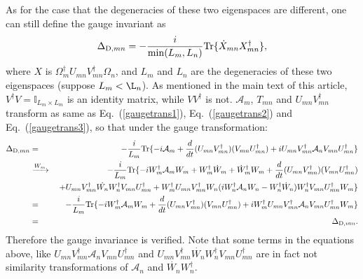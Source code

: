 \documentclass[aps,pra,twocolumn,groupedaddress,10pt]{revtex4}
\begin{document}
\begin{widetext}
As for the case that the degeneracies of these two eigenspaces
are different, one can still define the gauge invariant as
\begin{equation}
	\Delta_{{\rm{D}},mn} = -\frac{i}{{\rm{min}}(L_m, L_n)} {\rm{Tr}}\{\dot{X}_{mn}X_{mn}^{\dag}\},
\end{equation}
where $X$ is $\Omega^{\dag}_m U_{mn}V^{\dag}_{mn}\Omega_n$,
and $L_m$ and $L_n$ are the degeneracies of these two eigenspaces (suppose $L_m < \L_n$).
As mentioned in the main text of this article, $V^\dag V = \mathbb{I}_{L_m\times L_m}$ is an
identity matrix, while $V V^\dag$ is not.
$\mathcal{A}_{m}$, $T_{mn}$ and $U_{mn}V_{mn}^{\dag}$
transform as same as Eq.~(\ref{gaugetrans1}), Eq.~(\ref{gaugetrans2}) and Eq.~(\ref{gaugetrans3}),
so that under the gauge transformation:
\begin{eqnarray}
	\Delta_{{\rm{D}},mn}  &=& -\frac{i}{L_m} {\rm{Tr}} \{-i\mathcal{A}_m + \frac{d}{dt}(U_{mn}V_{mn}^{\dag})(V_{mn}U_{mn}^\dag) +i U_{mn}V_{mn}^\dag \mathcal{A}_n V_{mn}U_{mn}^{\dag}  \}\\
	&\xrightarrow{W_m}{}& -\frac{i}{L_m} {\rm{Tr}} \{ -i W_m^{\dag}\mathcal{A}_m W_m + W_m^{\dag}\dot{W}_m + \dot{W}_m^{\dag}W_m + \frac{d}{dt}(U_{mn}V_{mn}^{\dag})(V_{mn}U_{mn}^\dag) \\
	& &+  U_{mn}V_{mn}^{\dag} \dot{W_n}W_n^{\dag} V_{mn}U_{mn}^\dag  + W_m^{\dag}U_{mn}V_{mn}^{\dag}W_n(iW_n^{\dag}\mathcal{A}_n W_n - W_n^{\dag}\dot{W}_n)W_n^{\dag} V_{mn}U_{mn}^{\dag}W_m\}\\
	&=& -\frac{i}{L_m} {\rm{Tr}}\{ -i W_m^{\dag}\mathcal{A}_m W_m +  \frac{d}{dt}(U_{mn}V_{mn}^{\dag})(V_{mn}U_{mn}^\dag) +i W_m^{\dag}U_{mn}V_{mn}^{\dag} \mathcal{A}_n V_{mn}U_{mn}^{\dag} W_m \}\\
	&=& \Delta_{{\rm{D}},mn}.
\end{eqnarray}
Therefore the gauge invariance is verified.
Note that some terms in the equations above, like $U_{mn}V_{mn}^\dag \mathcal{A}_n V_{mn}U_{mn}^{\dag} $ and $U_{mn}V_{mn}^{\dag} \dot{W_n}W_n^{\dag} V_{mn}U_{mn}^\dag$ are in fact not similarity transformations of $\mathcal{A}_n$ and $\dot{W_n}W_n^{\dag}$.


\end{widetext}
\end{document}
